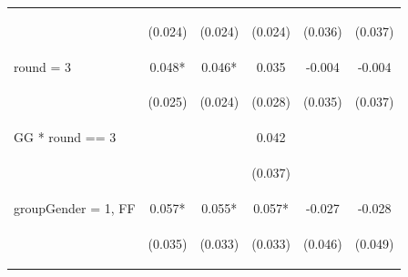 \documentclass{article} %
\begin{document}
\begin{table}[H]
\begin{center}
\begin{tabular}{lccccc}
\vspace{4pt} & \begin{footnotesize}(0.024)\end{footnotesize} & \begin{footnotesize}(0.024)\end{footnotesize} & \begin{footnotesize}(0.024)\end{footnotesize} & \begin{footnotesize}(0.036)\end{footnotesize} & \begin{footnotesize}(0.037)\end{footnotesize} \\
round = 3 & 0.048* & 0.046* & 0.035 & -0.004 & -0.004 \\
\vspace{4pt} & \begin{footnotesize}(0.025)\end{footnotesize} & \begin{footnotesize}(0.024)\end{footnotesize} & \begin{footnotesize}(0.028)\end{footnotesize} & \begin{footnotesize}(0.035)\end{footnotesize} & \begin{footnotesize}(0.037)\end{footnotesize} \\
GG * round == 3 &  &  & 0.042 &  &  \\
\vspace{4pt} & \begin{footnotesize}\end{footnotesize} & \begin{footnotesize}\end{footnotesize} & \begin{footnotesize}(0.037)\end{footnotesize} & \begin{footnotesize}\end{footnotesize} & \begin{footnotesize}\end{footnotesize} \\
groupGender = 1, FF & 0.057* & 0.055* & 0.057* & -0.027 & -0.028 \\
\vspace{4pt} & \begin{footnotesize}(0.035)\end{footnotesize} & \begin{footnotesize}(0.033)\end{footnotesize} & \begin{footnotesize}(0.033)\end{footnotesize} & \begin{footnotesize}(0.046)\end{footnotesize} & \begin{footnotesize}(0.049)\end{footnotesize} \\

\end{tabular}
\end{center}
\end{table}
\end{document}
